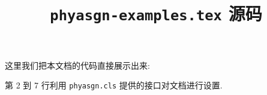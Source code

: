 \documentclass{phyasgn}
\title{\texttt{phyasgn-examples.tex} 源码}
\date{}
\begin{document}
\maketitle

这里我们把本文档的代码直接展示出来:

第 2 到 7 行利用 \verb"phyasgn.cls" 提供的接口对文档进行设置.
\end{document}
